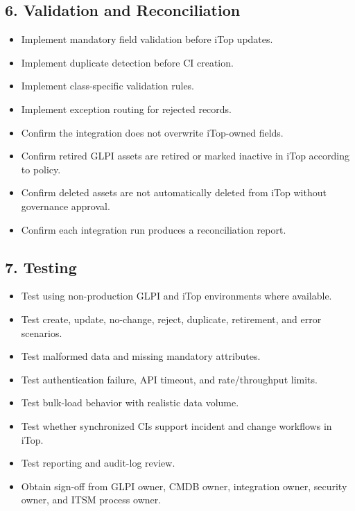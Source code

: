 \documentclass[11pt]{article}
\newcommand{\checkbox}{\fbox{\rule{0pt}{1.1ex}\rule{1.1ex}{0pt}}}
\begin{document}
\subsection{6. Validation and Reconciliation}
\begin{itemize}
  \item[\checkbox] Implement mandatory field validation before iTop updates.
  \item[\checkbox] Implement duplicate detection before CI creation.
  \item[\checkbox] Implement class-specific validation rules.
  \item[\checkbox] Implement exception routing for rejected records.
  \item[\checkbox] Confirm the integration does not overwrite iTop-owned fields.
  \item[\checkbox] Confirm retired GLPI assets are retired or marked inactive in iTop according to policy.
  \item[\checkbox] Confirm deleted assets are not automatically deleted from iTop without governance approval.
  \item[\checkbox] Confirm each integration run produces a reconciliation report.
\end{itemize}

\subsection{7. Testing}
\begin{itemize}
  \item[\checkbox] Test using non-production GLPI and iTop environments where available.
  \item[\checkbox] Test create, update, no-change, reject, duplicate, retirement, and error scenarios.
  \item[\checkbox] Test malformed data and missing mandatory attributes.
  \item[\checkbox] Test authentication failure, API timeout, and rate/throughput limits.
  \item[\checkbox] Test bulk-load behavior with realistic data volume.
  \item[\checkbox] Test whether synchronized CIs support incident and change workflows in iTop.
  \item[\checkbox] Test reporting and audit-log review.
  \item[\checkbox] Obtain sign-off from GLPI owner, CMDB owner, integration owner, security owner, and ITSM process owner.
\end{itemize}
\end{document}
